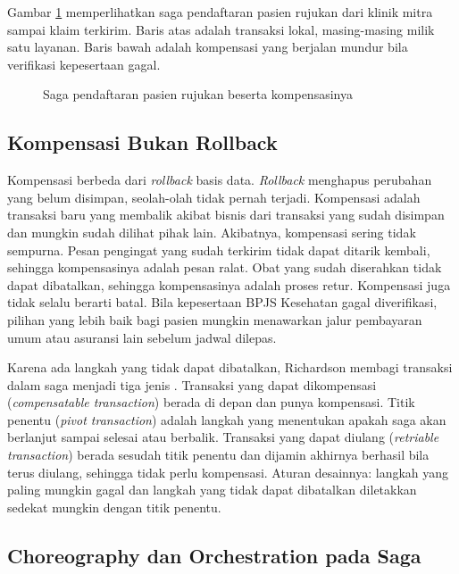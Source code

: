 Gambar \ref{fig:ch10-saga} memperlihatkan saga pendaftaran pasien rujukan dari klinik mitra
sampai klaim terkirim. Baris atas adalah transaksi lokal, masing-masing milik satu layanan. Baris
bawah adalah kompensasi yang berjalan mundur bila verifikasi kepesertaan gagal.

\begin{figure}[!htb]
  \centering
  
  \caption{Saga pendaftaran pasien rujukan beserta kompensasinya}
  \label{fig:ch10-saga}
\end{figure}

\subsection{Kompensasi Bukan Rollback}

Kompensasi berbeda dari \textit{rollback} basis data. \textit{Rollback} menghapus perubahan yang
belum disimpan, seolah-olah tidak pernah terjadi. Kompensasi adalah transaksi baru yang membalik
akibat bisnis dari transaksi yang sudah disimpan dan mungkin sudah dilihat pihak lain. Akibatnya,
kompensasi sering tidak sempurna. Pesan pengingat yang sudah terkirim tidak dapat ditarik kembali,
sehingga kompensasinya adalah pesan ralat. Obat yang sudah diserahkan tidak dapat dibatalkan,
sehingga kompensasinya adalah proses retur. Kompensasi juga tidak selalu berarti batal. Bila
kepesertaan BPJS Kesehatan gagal diverifikasi, pilihan yang lebih baik bagi pasien mungkin
menawarkan jalur pembayaran umum atau asuransi lain sebelum jadwal dilepas.

Karena ada langkah yang tidak dapat dibatalkan, Richardson membagi transaksi dalam saga menjadi tiga
jenis \cite{richardson2018}. Transaksi yang dapat dikompensasi (\textit{compensatable transaction})
berada di depan dan punya kompensasi. Titik penentu (\textit{pivot transaction}) adalah langkah yang
menentukan apakah saga akan berlanjut sampai selesai atau berbalik. Transaksi yang dapat diulang
(\textit{retriable transaction}) berada sesudah titik penentu dan dijamin akhirnya berhasil bila
terus diulang, sehingga tidak perlu kompensasi. Aturan desainnya: langkah yang paling mungkin gagal
dan langkah yang tidak dapat dibatalkan diletakkan sedekat mungkin dengan titik penentu.

\subsection{Choreography dan Orchestration pada Saga}

